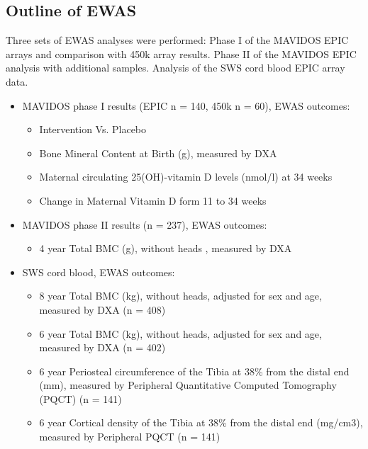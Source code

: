 \documentclass[
]{book}
\providecommand{\tightlist}{%
  \setlength{\itemsep}{0pt}\setlength{\parskip}{0pt}}
\begin{document}
\hypertarget{outline-of-ewas}{%
\subsection{Outline of EWAS}\label{outline-of-ewas}}

Three sets of EWAS analyses were performed:
Phase I of the MAVIDOS EPIC arrays and comparison with 450k array results.
Phase II of the MAVIDOS EPIC analysis with additional samples.
Analysis of the SWS cord blood EPIC array data.

\begin{itemize}
\tightlist
\item
  MAVIDOS phase I results (EPIC n = 140, 450k n = 60), EWAS outcomes:

  \begin{itemize}
  \tightlist
  \item
    Intervention Vs. Placebo
  \item
    Bone Mineral Content at Birth (g), measured by DXA
  \item
    Maternal circulating 25(OH)-vitamin D levels (nmol/l) at 34 weeks
  \item
    Change in Maternal Vitamin D form 11 to 34 weeks
  \end{itemize}
\item
  MAVIDOS phase II results (n = 237), EWAS outcomes:

  \begin{itemize}
  \tightlist
  \item
    4 year Total BMC (g), without heads , measured by DXA
  \end{itemize}
\item
  SWS cord blood, EWAS outcomes:

  \begin{itemize}
  \tightlist
  \item
    8 year Total BMC (kg), without heads, adjusted for sex and age, measured by DXA (n = 408)
  \item
    6 year Total BMC (kg), without heads, adjusted for sex and age, measured by DXA (n = 402)
  \item
    6 year Periosteal circumference of the Tibia at 38\% from the distal end (mm), measured by Peripheral Quantitative Computed Tomography (PQCT) (n = 141)
  \item
    6 year Cortical density of the Tibia at 38\% from the distal end (mg/cm3), measured by Peripheral PQCT (n = 141)
  \end{itemize}
\end{itemize}
\end{document}
